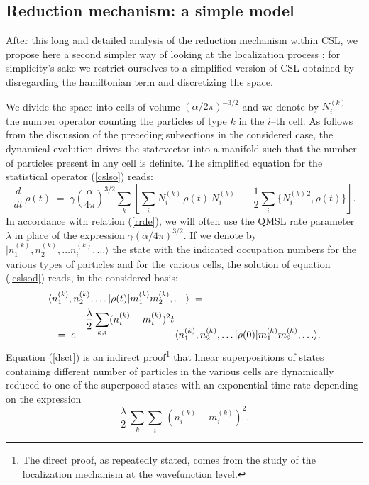 \documentclass[12pt]{article}
\begin{document}
\subsection{Reduction mechanism: a simple model} \label{sec75}


After this long and detailed analysis of the reduction mechanism
within CSL, we propose here a second simpler way of looking at
the localization process \cite{cc}; for simplicity's  sake we
restrict ourselves to a simplified version of CSL obtained by
disregarding the hamiltonian term and discretizing the space.

We divide the space into cells of volume $(\alpha/2\pi)^{-3/2}$
and we denote by $N_{i}^{(k)}$ the number operator counting the
particles of type $k$ in the $i$--th cell. As follows from the
discussion of the preceding subsections in the considered case,
the dynamical evolution drives the statevector into a manifold
such that the number of particles present in any cell is definite.
The simplified equation for the statistical operator (\ref{cslso})
reads:
\begin{equation} \label{cslsod}
\frac{d}{dt}\, \rho(t) \; = \;
\gamma\left(\frac{\alpha}{4\pi}\right)^{3/2} \sum_{k} \left[
\sum_{i} N_{i}^{(k)}\, \rho(t)\, N_{i}^{(k)} \; - \;
\frac{1}{2}\sum_{i} \{ N_{i}^{(k)\,2} , \rho(t) \} \right].
\end{equation}
In accordance with relation (\ref{rrde}), we will often use the
QMSL rate parameter $\lambda$ in place of the expression $\gamma
(\alpha/4\pi)^{3/2}$. If we denote by $|n_{1}^{(k)}, n_{2}^{(k)},
\ldots n_{i}^{(k)}, \ldots \rangle$ the state with the indicated
occupation numbers for the various types of particles and for the
various cells, the solution of equation (\ref{cslsod}) reads, in
the considered basis:
\begin{eqnarray} \label{dsct}
\lefteqn{ \langle n_{1}^{(k)}, n_{2}^{(k)},\ldots |\rho(t)|
m_{1}^{(k)} m_{2}^{(k)},\ldots\rangle \; = \;} \nonumber \\ & &
=\; e^{\displaystyle -\, \frac{\lambda}{2}\sum_{k,i} (n_{i}^{(k)}
- m_{i}^{(k)})^{2}t} \langle n_{1}^{(k)}, n_{2}^{(k)},\ldots
|\rho(0)| m_{1}^{(k)} m_{2}^{(k)},\ldots\rangle.
\end{eqnarray}
Equation (\ref{dsct}) is an indirect proof\footnote{The direct
proof, as repeatedly stated, comes from the study of the
localization mechanism at the wavefunction level.} that linear
superpositions of states containing different number of particles
in the various cells are dynamically reduced to one of the
superposed states with an exponential time rate depending on the
expression
\[
\frac{\lambda}{2}\, \sum_{k} \sum_{i}\, (n_{i}^{(k)} -
m_{i}^{(k)})^{2}.
\]
\end{document}
